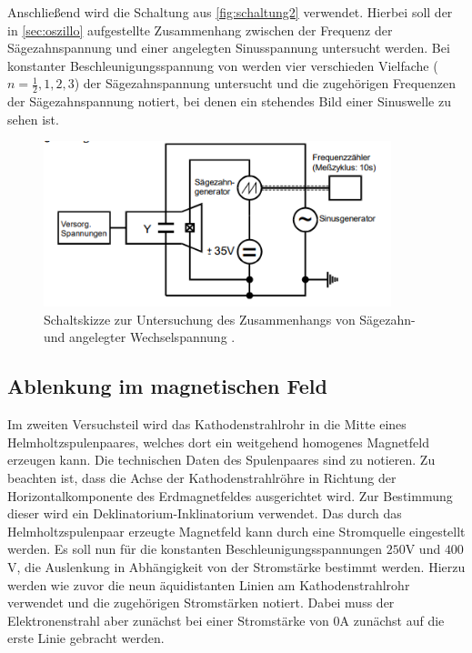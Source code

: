     Anschließend wird die Schaltung aus \autoref{fig:schaltung2} verwendet. Hierbei soll der in \autoref{sec:oszillo} aufgestellte
    Zusammenhang zwischen der Frequenz der Sägezahnspannung und einer angelegten Sinusspannung untersucht werden. 
    Bei konstanter Beschleunigungsspannung von werden vier verschieden Vielfache ($n = \frac{1}{2}, 1, 2, 3$) der Sägezahnspannung untersucht
    und die zugehörigen Frequenzen der Sägezahnspannung notiert, bei denen ein stehendes Bild einer Sinuswelle zu sehen ist.
     \begin{figure}
        \centering
        \includegraphics[width=0.9\textwidth]{content/wechselschaltung.png}
        \caption{Schaltskizze zur Untersuchung des Zusammenhangs von Sägezahn- und angelegter Wechselspannung \cite{V501-und-V502}.}
        \label{fig:schaltung2}
    \end{figure}
    \subsection{Ablenkung im magnetischen Feld}
    Im zweiten Versuchsteil wird das Kathodenstrahlrohr in die Mitte eines Helmholtzspulenpaares, welches dort ein weitgehend homogenes Magnetfeld
    erzeugen kann. Die technischen Daten des Spulenpaares sind zu notieren. Zu beachten ist, dass die Achse der Kathodenstrahlröhre in 
    Richtung der Horizontalkomponente des Erdmagnetfeldes ausgerichtet wird. Zur Bestimmung dieser wird ein Deklinatorium-Inklinatorium
    verwendet. Das durch das Helmholtzspulenpaar erzeugte Magnetfeld kann durch eine Stromquelle eingestellt werden. Es soll nun für die 
    konstanten Beschleunigungsspannungen $250$V und $400$V, die Auslenkung in Abhängigkeit von der Stromstärke bestimmt werden. 
    Hierzu werden wie zuvor die neun äquidistanten Linien am Kathodenstrahlrohr verwendet und die zugehörigen Stromstärken notiert.
    Dabei muss der Elektronenstrahl aber zunächst bei einer Stromstärke von $0$A zunächst auf die erste Linie gebracht werden.
    
